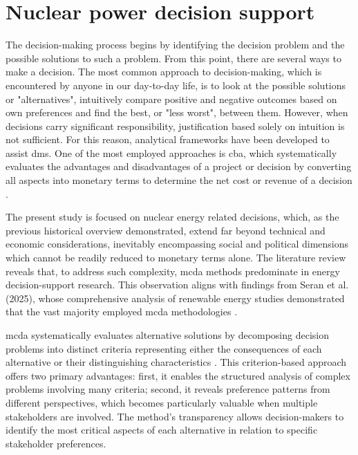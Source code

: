\section{Nuclear power decision support}
\label{sec:decision_support}
The decision-making process begins by identifying the decision problem and the possible solutions to such a problem. From this point, there are several ways to make a decision. The most common approach to decision-making, which is encountered by anyone in our day-to-day life, is to look at the possible solutions or "alternatives",  intuitively compare positive and negative outcomes based on own preferences and find the best, or "less worst", between them. However, when decisions carry significant responsibility, justification based solely on intuition is not sufficient. For this reason, analytical frameworks have been developed to assist \glspl{dm}. One of the most employed  approaches is \gls{cba}, which systematically evaluates the advantages and disadvantages of a project or decision by converting all aspects into monetary terms to determine the net cost or revenue of a decision \cite{Boardman_Greenberg_Vining_Weimer_2018}.

The present study is focused on nuclear energy related decisions, which, as the previous historical overview demonstrated, extend far beyond technical and economic considerations, inevitably encompassing social and political dimensions which cannot be readily reduced to monetary terms alone. The literature review reveals that, to address such complexity, \gls{mcda} methods predominate in energy decision-support research. This observation aligns with findings from Seran et al. (2025), whose comprehensive analysis of renewable energy studies demonstrated that the vast majority employed \gls{mcda} methodologies \cite{SERAN2025100044}.

\gls{mcda} systematically evaluates alternative solutions by decomposing decision problems into distinct criteria representing either the consequences of each alternative or their distinguishing characteristics \cite{ROY1990324}. This criterion-based approach offers two primary advantages: first, it enables the structured analysis of complex problems involving many criteria; second, it reveals preference patterns from different perspectives, which becomes particularly valuable when multiple stakeholders are involved. The method's transparency allows decision-makers to identify the most critical aspects of each alternative in relation to specific stakeholder preferences.

